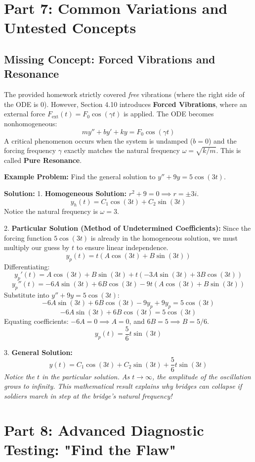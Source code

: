 \documentclass[11pt]{article}
\begin{document}
\newpage
\section{Part 7: Common Variations and Untested Concepts}

\subsection{Missing Concept: Forced Vibrations and Resonance}
The provided homework strictly covered \textit{free} vibrations (where the right side of the ODE is 0). However, Section 4.10 introduces \textbf{Forced Vibrations}, where an external force $F_{\text{ext}}(t) = F_0 \cos(\gamma t)$ is applied. The ODE becomes nonhomogeneous:
\[ my'' + by' + ky = F_0 \cos(\gamma t) \]
A critical phenomenon occurs when the system is undamped ($b=0$) and the forcing frequency $\gamma$ exactly matches the natural frequency $\omega = \sqrt{k/m}$. This is called \textbf{Pure Resonance}.

\textbf{Example Problem:} Find the general solution to $y'' + 9y = 5 \cos(3t)$.

\textbf{Solution:}
1. \textbf{Homogeneous Solution:} $r^2 + 9 = 0 \implies r = \pm 3i$.
\[ y_h(t) = C_1 \cos(3t) + C_2 \sin(3t) \]
Notice the natural frequency is $\omega = 3$.

2. \textbf{Particular Solution (Method of Undetermined Coefficients):}
Since the forcing function $5 \cos(3t)$ is already in the homogeneous solution, we must multiply our guess by $t$ to ensure linear independence.
\[ y_p(t) = t(A \cos(3t) + B \sin(3t)) \]
Differentiating:
\[ y_p'(t) = A \cos(3t) + B \sin(3t) + t(-3A \sin(3t) + 3B \cos(3t)) \]
\[ y_p''(t) = -6A \sin(3t) + 6B \cos(3t) - 9t(A \cos(3t) + B \sin(3t)) \]
Substitute into $y'' + 9y = 5 \cos(3t)$:
\[ -6A \sin(3t) + 6B \cos(3t) - 9y_p + 9y_p = 5 \cos(3t) \]
\[ -6A \sin(3t) + 6B \cos(3t) = 5 \cos(3t) \]
Equating coefficients: $-6A = 0 \implies A = 0$, and $6B = 5 \implies B = 5/6$.
\[ y_p(t) = \frac{5}{6}t \sin(3t) \]

3. \textbf{General Solution:}
\[ y(t) = C_1 \cos(3t) + C_2 \sin(3t) + \frac{5}{6}t \sin(3t) \]
\textit{Notice the $t$ in the particular solution. As $t \to \infty$, the amplitude of the oscillation grows to infinity. This mathematical result explains why bridges can collapse if soldiers march in step at the bridge's natural frequency!}

\newpage
\section{Part 8: Advanced Diagnostic Testing: "Find the Flaw"}
\end{document}
